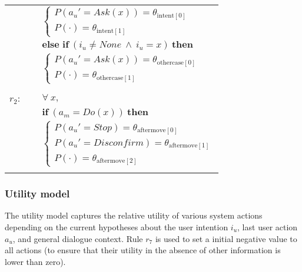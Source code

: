 \begin{footnotesize}
\begin{longtable}{p{2cm}l}
& \;\;\;\;\; $ \begin{cases}P(\mathit{a_u}'\!=\!\mathit{{Ask(x)}})\!=\!\theta_{\mathrm{intent[0]}} \\
P(\cdot)\!=\!\theta_{\mathrm{intent[1]}} \end{cases}$  \vspace{1mm} \\ 
& $ \textbf{else if} \ (\mathit{i_u}\!\neq\!\mathit{None} \ \land \ \mathit{i_u}\!=\!x) \ \textbf{then}$ \\
& \;\;\;\;\; $ \begin{cases}P(\mathit{a_u}'\!=\!\mathit{{Ask(x)}})\!=\!\theta_{\mathrm{othercase[0]}} \\
P(\cdot)\!=\!\theta_{\mathrm{othercase[1]}} \end{cases}$ \\ \\[-1mm]
$r_{2}$: \ \ & $\forall \ x,$ \\
& $ \textbf{if} \ (\mathit{a_m}\!=\!\mathit{Do(x)}) \ \textbf{then} $ \\
 & \;\;\;\;\; $ \begin{cases}P(\mathit{a_u}'\!=\!\mathit{Stop})\!=\!\theta_{\mathrm{aftermove[0]}} \\
P(\mathit{a_u}'\!=\!\mathit{Disconfirm})\!=\!\theta_{\mathrm{aftermove[1]}} \\
P(\cdot)\!=\!\theta_{\mathrm{aftermove[2]}} \end{cases}$ \\ \\[-1mm]
\end{longtable}
\end{footnotesize}


\subsubsection*{Utility model}

The utility model captures the relative utility of various system actions depending on the current hypotheses about the user intention $i_u$, last user action $a_u$, and general dialogue context. Rule $r_7$ is used to set a initial negative value to all actions (to ensure that their utility in the absence of other information is lower than zero). 

